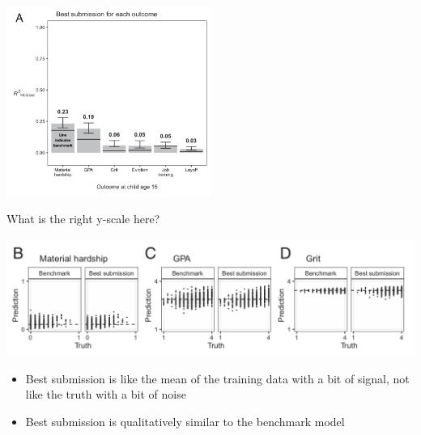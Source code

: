 \documentclass[aspectratio=169]{beamer}
\begin{document}
\begin{frame}

\begin{center}
\includegraphics[width=0.5\textwidth]{figures/salganik_measuring_2020_fig3a}
\end{center}

\pause
\vfill
What is the right y-scale here?

\end{frame}
\begin{frame}

\begin{center}
\includegraphics[width=\textwidth]{figures/salganik_measuring_2020_fig3b-d}
\end{center}

\begin{itemize}
\item Best submission is like the mean of the training data with a bit of signal, not like the truth with a bit of noise
\item Best submission is qualitatively similar to the benchmark model 
\end{itemize}

\end{frame}
\end{document}
